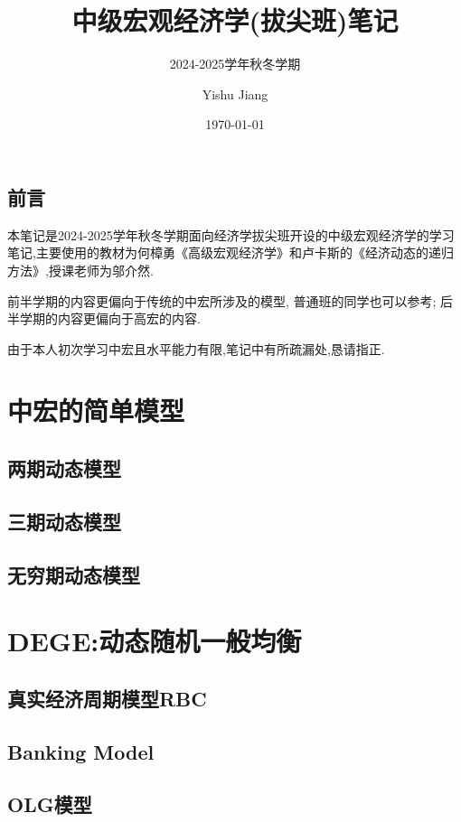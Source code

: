 \documentclass[lang=cn,10pt]{elegantbook}
\title{中级宏观经济学(拔尖班)笔记}
\subtitle{2024-2025学年秋冬学期}
\author{Yishu Jiang}
\institute{School of Economics,Zhejiang University}
\date{\today}
\begin{document}
\maketitle
\frontmatter
\chapter*{前言}
{\fangsong 
    本笔记是2024-2025学年秋冬学期面向经济学拔尖班开设的中级宏观经济学的学习笔记,主要使用的教材为何樟勇《高级宏观经济学》和卢卡斯的《经济动态的递归方法》,授课老师为邬介然.
    
    前半学期的内容更偏向于传统的中宏所涉及的模型, 普通班的同学也可以参考; 后半学期的内容更偏向于高宏的内容.

    由于本人初次学习中宏且水平能力有限,笔记中有所疏漏处,恳请指正.
}
\newpage

\tableofcontents

\mainmatter
\part{中宏的简单模型}

\chapter{两期动态模型}
\newpage

\chapter{三期动态模型}
\newpage

\chapter{无穷期动态模型}
\newpage

\part{DEGE:动态随机一般均衡}

\chapter{真实经济周期模型RBC}

\chapter{Banking Model}

\chapter{OLG模型}
\end{document}
